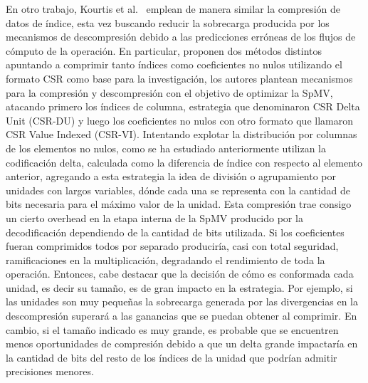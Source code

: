 En otro trabajo, Kourtis et al.~\cite{Kourtis2008} emplean de manera similar la compresión de datos de índice, esta vez buscando reducir la sobrecarga producida
por los mecanismos de descompresión debido a las predicciones erróneas de los flujos de cómputo de la operación. En particular, proponen dos métodos distintos apuntando a comprimir tanto índices como coeficientes no nulos utilizando el formato CSR como base para la investigación, los autores plantean mecanismos para la compresión y descompresión con el objetivo de optimizar la SpMV, atacando primero los índices de columna, estrategia que denominaron CSR Delta Unit (CSR-DU) y luego los coeficientes no nulos con otro formato que llamaron CSR Value Indexed (CSR-VI).  Intentando explotar la distribución por columnas de los elementos no nulos, como se ha estudiado anteriormente utilizan la codificación delta, calculada como la diferencia de índice con respecto al elemento anterior, agregando a esta estrategia la idea de división o agrupamiento por unidades con largos variables, dónde cada una se representa con la cantidad de bits necesaria para el máximo valor de la unidad. Esta compresión trae consigo un cierto overhead en la etapa interna de la SpMV producido por la decodificación dependiendo de la cantidad de bits utilizada. Si los coeficientes fueran comprimidos todos por separado produciría, casi con total seguridad, ramificaciones en la multiplicación, degradando el rendimiento de toda la operación. Entonces, cabe destacar que la decisión de cómo es conformada cada unidad, es decir su tamaño, es de gran impacto en la estrategia. Por ejemplo, si las unidades son muy pequeñas la sobrecarga generada por las divergencias en la descompresión superará a las ganancias que se puedan obtener al comprimir. En cambio, si el tamaño indicado es muy grande, es probable que se encuentren menos oportunidades de compresión debido a que un delta grande impactaría en la cantidad de bits del resto de los índices de la unidad que podrían admitir precisiones menores.


